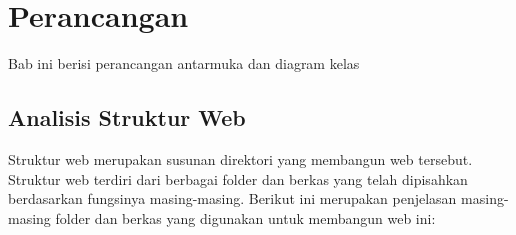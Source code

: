\chapter{Perancangan}
\label{chapter:perancangan}
Bab ini berisi perancangan antarmuka dan diagram kelas

\section{Analisis Struktur Web}
\label{sec:analisisStrukturWeb}

Struktur web merupakan susunan direktori yang membangun web tersebut. Struktur web terdiri dari berbagai folder dan berkas yang telah dipisahkan berdasarkan fungsinya masing-masing. Berikut ini merupakan penjelasan masing-masing folder dan berkas yang digunakan untuk membangun web ini:

